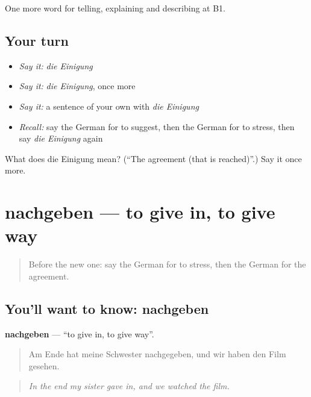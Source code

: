 \begin{grammarlens}[title={What you've built}]
One more word for telling, explaining and describing at B1.
\end{grammarlens}

\subsection*{Your turn}
\begin{itemize}
\raggedright
  \item \emph{Say it:} \emph{die Einigung}
  \item \emph{Say it:} \emph{die Einigung}, once more
  \item \emph{Say it:} a sentence of your own with \emph{die Einigung}
  \item \emph{Recall:} say the German for to suggest, then the German for to stress, then say \emph{die Einigung} again
\end{itemize}

\begin{tcolorbox}[breakable,colback=teal!4,colframe=teal!35!black,title={Before you move on}]
What does die Einigung mean? (\textquotedblleft{}The agreement (that is reached)\textquotedblright{}.) Say it once more.
\end{tcolorbox}
\section[nachgeben]{nachgeben — to give in, to give way}

\label{lesson:GE-C336-nachgeben}



\begin{quote}
Before the new one: say the German for to stress, then the German for the agreement.
\end{quote}

\subsection*{You'll want to know: nachgeben}
\textbf{nachgeben} — \textquotedblleft{}to give in, to give way\textquotedblright{}.

\begin{quote}
Am Ende hat meine Schwester nachgegeben, und wir haben den Film gesehen.
\end{quote}

\begin{quote}
\emph{In the end my sister gave in, and we watched the film.}
\end{quote}

